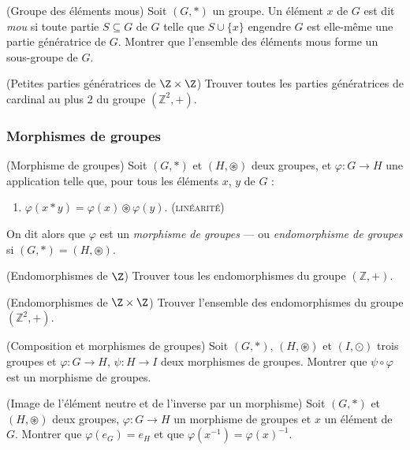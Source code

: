 \begin{exo}(Groupe des éléments mous)
Soit $(G, \ast)$ un groupe.
Un élément $x$ de $G$ est dit \emph{mou} si
toute partie $S \subseteq G$ de $G$ telle que
$S \cup \{x\}$ engendre $G$ est elle-même
une partie génératrice de $G$.
Montrer que l'ensemble des éléments mous forme un sous-groupe de $G$.
\end{exo}

\begin{exo}(Petites parties génératrices de $\Z \times \Z$)
Trouver toutes les parties génératrices de cardinal au plus $2$
du groupe $(\mathbb{Z}^2, +)$.
\end{exo}

\subsubsection{Morphismes de groupes}

\begin{defn}(Morphisme de groupes)
Soit $(G, \ast)$ et $(H, \circledast)$ deux groupes,
et $\varphi : G \to H$ une application telle que,
pour tous les éléments $x$, $y$ de $G$ :
\begin{enumerate}
\item $\varphi(x \ast y) = \varphi(x) \circledast \varphi(y)$. \hfill(\textsc{linéarité})
\end{enumerate}
On dit alors que $\varphi$ est un \emph{morphisme de groupes} ---
ou \emph{endomorphisme de groupes} si $(G, \ast) = (H, \circledast)$.
\end{defn}

\begin{exo}(Endomorphismes de $\Z$)
Trouver tous les endomorphismes du groupe $(\mathbb{Z},+)$.
\end{exo}

\begin{exo}(Endomorphismes de $\Z \times \Z$)
Trouver l'ensemble des endomorphismes du groupe $(\mathbb{Z}^2,+)$.
\end{exo}

\begin{exo}(Composition et morphismes de groupes)
Soit $(G, \ast)$, $(H, \circledast)$ et $(I, \odot)$ trois groupes et
$\varphi : G \to H$, $\psi : H \to I$ deux morphismes de groupes.
Montrer que $\psi \circ \varphi$ est un morphisme de groupes.
\end{exo}

\begin{exo}(Image de l'élément neutre et de l'inverse par un morphisme)
Soit $(G, \ast)$ et $(H, \circledast)$ deux groupes,
$\varphi : G \to H$ un morphisme de groupes et $x$ un élément de $G$.
Montrer que $\varphi(e_G) = e_H$ et que $\varphi(x^{-1}) = \varphi(x)^{-1}$.
\end{exo}

